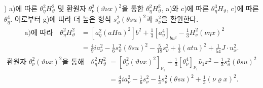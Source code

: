 
) a)에 따른 $\theta_\eta^2H_\vartheta^2$ 및 환원자 $\theta_\nu^2(\vartheta\nu x)^2$을 통한 $\theta_\eta^2H_\vartheta^2$, a)와 c)에 따른 $\theta_\eta^3H_\vartheta$, c)에 따른 $\theta_\eta^4$. 이로부터 g)에 따라 더 높은 형식 $s_\vartheta^2(\theta su)^2$과 $s_\nu^2$을 환원한다.
\[
\begin{aligned}
\text{a)에 따라}\quad
\theta_\eta^2H_\vartheta^2&=[a_\eta^2(aHu)^2]b^2+\frac13[a_\eta^4]_{bu^2}-\frac13H_\nu^2(\nu\eta x)^2\\
&=\frac49ia_\nu^2-\frac16s_\vartheta^2(\theta su)^2-\frac5{18}s_\nu^2+\frac13(atu)^2+\frac1{54}J\cdot u_x^2.
\end{aligned}
\]
\[
\begin{aligned}
\text{환원자 }\theta_\nu^2(\vartheta\nu x)^2\text{을 통해}\quad
\theta_\eta^2H_\vartheta^2
&=[\theta_\nu^2(\vartheta\nu x)^2]_{\nu_1}+\frac13[\theta_\nu^4]_{\nu_1}\widehat{\nu}_1x^2-\frac13s_\vartheta^2(\theta su)^2\\
&=\frac49ia_\nu^2-\frac16s_\nu^2-\frac13s_\vartheta^2(\theta su)^2+\frac13(\nu\varrho x)^2.
\end{aligned}
\]
